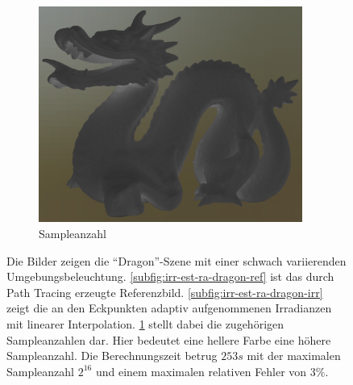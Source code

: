 \begin{figure}[h]
			\begin{subfigure}[t]{0.33\textwidth}
				\center
				\includegraphics[width=0.95\textwidth]{pic/irr_est-ra-dragon-scount.png}
				\caption{Sampleanzahl}
				\label{subfig:irr-est-ra-dragon-scount}
			\end{subfigure}
			\caption[Erste adaptive Vertex-Irradiance-Map anhand der \enquote{Dragon}-Szene]{Die Bilder zeigen die \enquote{Dragon}-Szene mit einer schwach variierenden Umgebungsbeleuchtung. \ref{subfig:irr-est-ra-dragon-ref} ist das durch Path Tracing erzeugte Referenzbild. \ref{subfig:irr-est-ra-dragon-irr} zeigt die an den Eckpunkten adaptiv aufgenommenen Irradianzen mit linearer Interpolation. \ref{subfig:irr-est-ra-dragon-scount} stellt dabei die zugehörigen Sampleanzahlen dar. Hier bedeutet eine hellere Farbe eine höhere Sampleanzahl. Die Berechnungszeit betrug $253\unit{s}$ mit der maximalen Sampleanzahl $2^{16}$ und einem maximalen relativen Fehler von $3\unit{\%}$.}
			\label{fig:irr-est-ra-dragon}
		\end{figure}

